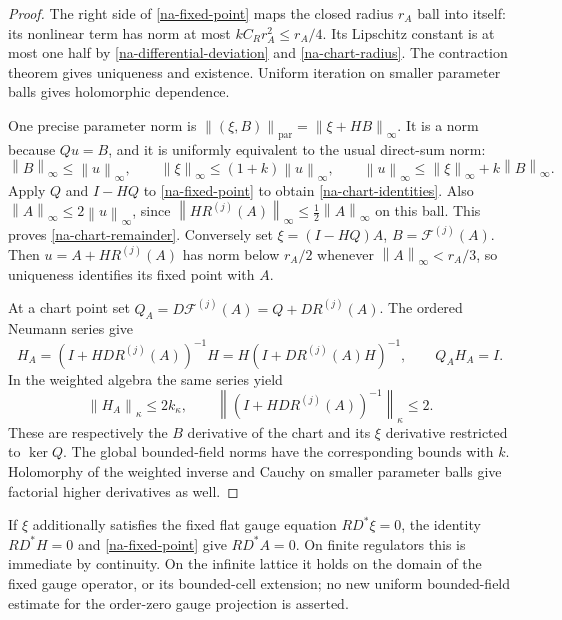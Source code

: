 \documentclass[11pt]{article}
\theoremstyle{remark}\newtheorem{remark}[theorem]{Remark}
\newcommand{\norm}[1]{\left\lVert#1\right\rVert}
\begin{document}
\begin{proof}
The right side of \eqref{na-fixed-point} maps the closed radius
$r_A$ ball into itself: its nonlinear term has norm at most
$kC_Rr_A^2\le r_A/4$. Its Lipschitz constant is at most one half
by \eqref{na-differential-deviation} and \eqref{na-chart-radius}.
The contraction theorem gives uniqueness and existence. Uniform
iteration on smaller parameter balls gives holomorphic dependence.

One precise parameter norm is
$\norm{(\xi,B)}_{\mathrm{par}}=\norm{\xi+HB}_\infty$.
It is a norm because $Qu=B$, and it is uniformly equivalent to
the usual direct-sum norm:
\[
 \norm{B}_\infty\le\norm{u}_\infty,\qquad
 \norm{\xi}_\infty\le(1+k)\norm{u}_\infty,\qquad
 \norm{u}_\infty\le\norm{\xi}_\infty+k\norm{B}_\infty.
\]
Apply $Q$ and $I-HQ$ to \eqref{na-fixed-point} to obtain
\eqref{na-chart-identities}. Also
$\norm{A}_\infty\le2\norm{u}_\infty$, since
$\norm{HR^{(j)}(A)}_\infty\le\frac12\norm{A}_\infty$ on this
ball. This proves \eqref{na-chart-remainder}. Conversely set
$\xi=(I-HQ)A$, $B=\mathcal F^{(j)}(A)$. Then
$u=A+HR^{(j)}(A)$ has norm below $r_A/2$ whenever
$\norm{A}_\infty<r_A/3$, so uniqueness identifies its fixed point
with $A$.

At a chart point set
$Q_A=D\mathcal F^{(j)}(A)=Q+DR^{(j)}(A)$. The ordered Neumann
series give
\begin{equation}
 H_A=(I+H DR^{(j)}(A))^{-1}H
      =H(I+DR^{(j)}(A)H)^{-1},\qquad Q_AH_A=I.
 \label{na-chart-right-inverse}
\end{equation}
In the weighted algebra the same series yield
\begin{equation}
 \norm{H_A}_\kappa\le2k_\kappa,
 \qquad \norm{(I+H DR^{(j)}(A))^{-1}}_\kappa\le2.
 \label{na-chart-weighted}
\end{equation}
These are respectively the $B$ derivative of the chart and its
$\xi$ derivative restricted to $\ker Q$. The global bounded-field
norms have the corresponding bounds with $k$. Holomorphy of the
weighted inverse and Cauchy on smaller parameter balls give
factorial higher derivatives as well.
\end{proof}

If $\xi$ additionally satisfies the fixed flat gauge equation
$RD^*\xi=0$, the identity $RD^*H=0$ and
\eqref{na-fixed-point} give $RD^*A=0$. On finite regulators this
is immediate by continuity. On the infinite lattice it holds on the
domain of the fixed gauge operator, or its bounded-cell extension;
no new uniform bounded-field estimate for the order-zero gauge
projection is asserted.
\end{document}
